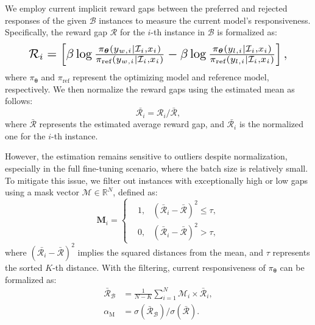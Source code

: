 We employ current implicit reward gaps between the preferred and rejected responses of the given $\mathcal{B}$ instances to measure the current model's responsiveness. Specifically, the reward gap $\mathcal{R}$ for the $i$-th instance in $\mathcal{B}$ is formalized as:
\begin{equation}
\label{equ:hardness}
\resizebox{.91\hsize}{!}{
    \(\mathcal{R}_i =\left [  \beta \log \frac{{\pi}_{\bm{\theta}}(y_{w,i}|\mathcal{I}_i,x_i)}{{\pi}_{\text{ref}}(y_{w,i}|\mathcal{I}_i,x_i)}
    -\beta \log \frac{{\pi}_{\bm{\theta}}(y_{l,i}|\mathcal{I}_i,x_i)}{{\pi}_{\text{ref}}(y_{l,i}|\mathcal{I}_i,x_i)} \right ],\)
}
\end{equation}
where ${\pi}_{\bm{\theta}}$ and ${\pi}_{\text{ref}}$ represent the optimizing model and reference model, respectively. 
We then normalize the reward gaps using the estimated mean as follows:
\begin{equation}
\label{equ:batch_hard}
    \bar{{\mathcal{R}}_i} = \mathcal{R}_i / \bar{\mathcal{R}},
\end{equation}
where $\bar{\mathcal{R}}$ represents the estimated average reward gap, and $\bar{{\mathcal{R}}_i}$ is the normalized one for the $i$-th instance.

However, the estimation remains sensitive to outliers despite normalization, especially in the full fine-tuning scenario, where the batch size is relatively small.
To mitigate this issue, we filter out instances with exceptionally high or low gaps using a mask vector $\mathcal{M} \in \mathbb{R}^{N}$, defined as:
\begin{equation}
\label{equ:filter hardness}
    \bm{M}_{i} =
    \left\{
    \begin{aligned}
    &1, & (\bar{\mathcal{R}}_{i} - \bar{\mathcal{R}})^{2} \le  \tau, \\ 
    &0, & (\bar{\mathcal{R}}_{i} - \bar{\mathcal{R}})^{2}  >   \tau,
    \end{aligned}
    \right. 
\end{equation}
where $(\bar{\mathcal{R}_{i}} - \bar{\mathcal{R}})^{2}$ implies the squared distances from the mean, and $\tau$ represents the sorted $K$-th distance.
With the filtering, current responsiveness of ${\pi}_{\bm{\theta}}$ can be formalized as:
\begin{align}
\label{equ:average hardness}
    \bar{\mathcal{R}}_{\mathcal{B}} & = \frac{1}{N-K} \sum_{i=1}^{N}  \mathcal{M}_{i} \times \bar{\mathcal{R}}_{i}, \\
        \label{equ:alpha_M}
    \alpha_{\text{M}} & = \sigma(\bar{\mathcal{R}}_{\mathcal{B}}) / \sigma(\bar{\mathcal{R}}).
\end{align}

